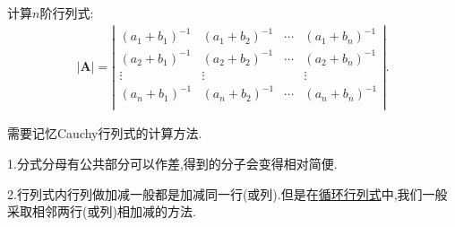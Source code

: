 \documentclass[lang=cn,newtx,10pt,scheme=chinese]{elegantbook}
\begin{document}
\begin{proposition}\label{Cauchy行列式}
计算$n$阶行列式:
\begin{gather}
|\boldsymbol{A}|=\left| \begin{matrix}
(a_1+b_1)^{-1}&		(a_1+b_2)^{-1}&		\cdots&		(a_1+b_n)^{-1}\\
(a_2+b_1)^{-1}&		(a_2+b_2)^{-1}&		\cdots&		(a_2+b_n)^{-1}\\
\vdots&		\vdots&		&		\vdots\\
(a_n+b_1)^{-1}&		(a_n+b_2)^{-1}&		\cdots&		(a_n+b_n)^{-1}\\
\end{matrix} \right|.
\nonumber
\end{gather}
\end{proposition}
\begin{note}
需要记忆Cauchy行列式的计算方法.

1.分式分母有公共部分可以作差,得到的分子会变得相对简便.

2.行列式内行列做加减一般都是加减同一行(或列).但是在\hyperlink{循环行列式}{循环行列式}中,我们一般采取相邻两行(或列)相加减的方法.
\end{note}
\end{document}
